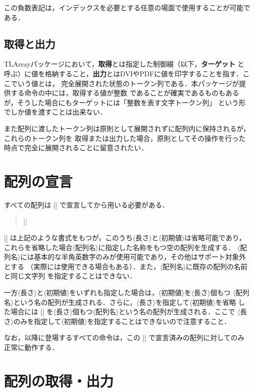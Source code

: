 \documentclass[a4paper,uplatex]{jsarticle}
\newcommand{\Meta}[1]{$\langle$\mbox{}#1\mbox{}$\rangle$}
\newenvironment{syntax}{\begin{quote}\small}{\end{quote}}
\begin{document}
この負数表記は，インデックスを必要とする任意の場面で使用することが可能である．

\subsection{取得と出力}

\textsf{TLArray}パッケージにおいて，\textbf{取得}とは指定した制御綴（以下，\textbf{ターゲット}
と呼ぶ）に値を格納すること，\textbf{出力}とはDVIやPDFに値を印字することを指す．ここでいう値とは，
完全展開された状態のトークン列である．本パッケージが提供する命令の中には，取得する値が整数
であることが確実であるものもあるが，そうした場合にもターゲットには「整数を表す文字トークン列」
という形でしか値を渡すことは出来ない．

また配列に渡したトークン列は原則として展開されずに配列内に保持されるが，これらのトークン列を
取得または出力した場合，原則としてその操作を行った時点で完全に展開されることに留意されたい．

\section{配列の宣言}

すべての配列は |\NewArray| で宣言してから用いる必要がある．
%
\begin{syntax}
|\NewArray[|\Meta{長さ}|][|\Meta{初期値}|]{|\Meta{配列名}|}|
\end{syntax}

|\NewArray| は上記のような書式をもつが，このうち\Meta{長さ}と\Meta{初期値}は省略可能であり，
これらを省略した場合\Meta{配列名}に指定した名称をもつ空の配列を生成する．
\Meta{配列名}には基本的な半角英数字のみが使用可能であり，その他はサポート対象外とする
（実際には使用できる場合もある）．また，\Meta{配列名}に既存の配列の名前と同じ文字列
を指定することはできない．

一方\Meta{長さ}と\Meta{初期値}をいずれも指定した場合は，\Meta{初期値}を\Meta{長さ}個もつ
\Meta{配列名}という名の配列が生成される．さらに，\Meta{長さ}を指定して\Meta{初期値}を省略
した場合には |\relax| を\Meta{長さ}個もつ\Meta{配列名}という名の配列が生成される．ここで
\Meta{長さ}のみを指定して\Meta{初期値}を指定することはできないので注意すること．

なお，以降に登場するすべての命令は，この |\NewArray| で宣言済みの配列に対してのみ正常に動作する．

\section{配列の取得・出力}
\end{document}
